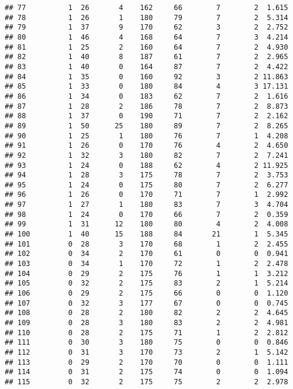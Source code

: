 \documentclass[12pt,]{article}
\begin{document}
\begin{verbatim}
## 77          1  26       4    162     66        7        2  1.615
## 78          1  26       1    180     79        7        2  5.314
## 79          1  37       9    170     62        3        2  2.752
## 80          1  46       4    168     64        7        3  4.214
## 81          1  25       2    160     64        7        2  4.930
## 82          1  40       8    187     61        7        2  2.965
## 83          1  40       0    164     87        7        2  4.422
## 84          1  35       0    160     92        3        2 11.863
## 85          1  33       0    180     84        4        3 17.131
## 86          1  34       0    183     62        7        2  1.616
## 87          1  28       2    186     78        7        2  8.873
## 88          1  37       0    190     71        7        2  2.162
## 89          1  50      25    180     89        7        2  8.265
## 90          1  25       1    180     76        7        1  4.208
## 91          1  26       0    170     76        4        2  4.650
## 92          1  32       3    180     82        7        2  7.241
## 93          1  24       0    188     62        4        2 11.925
## 94          1  28       3    175     78        7        2  3.753
## 95          1  24       0    175     80        7        2  6.277
## 96          1  26       0    170     71        7        1  2.992
## 97          1  27       1    180     83        7        3  4.704
## 98          1  24       0    170     66        7        2  0.359
## 99          1  31      12    180     80        4        2  4.008
## 100         1  40      15    188     84       21        1  5.345
## 101         0  28       3    170     68        1        2  2.455
## 102         0  34       2    170     61        0        0  0.941
## 103         0  34       1    170     72        1        2  2.478
## 104         0  29       2    175     76        1        1  3.212
## 105         0  32       2    175     83        2        1  5.214
## 106         0  29       2    175     66        0        0  1.120
## 107         0  32       3    177     67        0        0  0.745
## 108         0  28       2    180     82        2        2  4.645
## 109         0  28       3    180     83        2        2  4.981
## 110         0  28       2    175     71        1        2  2.812
## 111         0  30       3    180     75        0        0  0.846
## 112         0  31       3    170     73        2        1  5.142
## 113         0  29       2    170     70        0        0  1.111
## 114         0  31       2    175     74        0        0  1.094
## 115         0  32       2    175     75        2        2  2.978

\end{verbatim}
\end{document}
